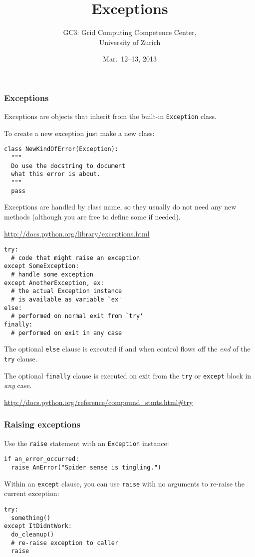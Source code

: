 \documentclass[english,serif,mathserif,xcolor=pdftex,dvipsnames,table]{beamer}
\title[Part 7]{%
  Exceptions
}
\author[GC3]{%
  GC3: Grid Computing Competence Center, \\
  University of Zurich
}
\date{Mar.~12--13, 2013}
\begin{document}
\maketitle


\begin{frame}[fragile]
  \frametitle{Exceptions}

  Exceptions are objects that inherit from the built-in
  \lstinline|Exception| class.

  \+
  To create a new exception just make a new class:
\begin{lstlisting}
class NewKindOfError(Exception):
  """
  Do use the docstring to document
  what this error is about.
  """
  pass
\end{lstlisting}

  \+
  Exceptions are handled by class name, so they usually do not need
  any new methods (although you are free to define some if needed).

  \begin{seealso}
    \url{http://docs.python.org/library/exceptions.html}
  \end{seealso}
\end{frame}


\begin{frame}[fragile]
\begin{lstlisting}
try:
  # code that might raise an exception
except SomeException:
  # handle some exception
except AnotherException, ex:
  # the actual Exception instance
  # is available as variable `ex'
else:
  # performed on normal exit from `try'
finally:
  # performed on exit in any case
\end{lstlisting}

  \+
  The optional \lstinline|else| clause is executed if and when control flows off the
  \emph{end} of the \lstinline|try| clause.

  \+
  The optional \lstinline|finally| clause is executed on exit from the
  \lstinline|try| or \lstinline|except| block in \emph{any} case.

  \begin{references}
    \scriptsize
    \url{http://docs.python.org/reference/compound_stmts.html#try}
\end{references}
\end{frame}


\begin{frame}[fragile]
  \frametitle{Raising exceptions}

  Use the \lstinline|raise| statement with an \texttt{Exception}
  instance:
\begin{lstlisting}
if an_error_occurred:
  raise AnError("Spider sense is tingling.")
\end{lstlisting}

  \+
  Within an \lstinline|except| clause, you can use \lstinline|raise|
  with no arguments to re-raise the current exception:
\begin{lstlisting}
try:
  something()
except ItDidntWork:
  do_cleanup()
  # re-raise exception to caller
  raise
\end{lstlisting}
\end{frame}
\end{document}
